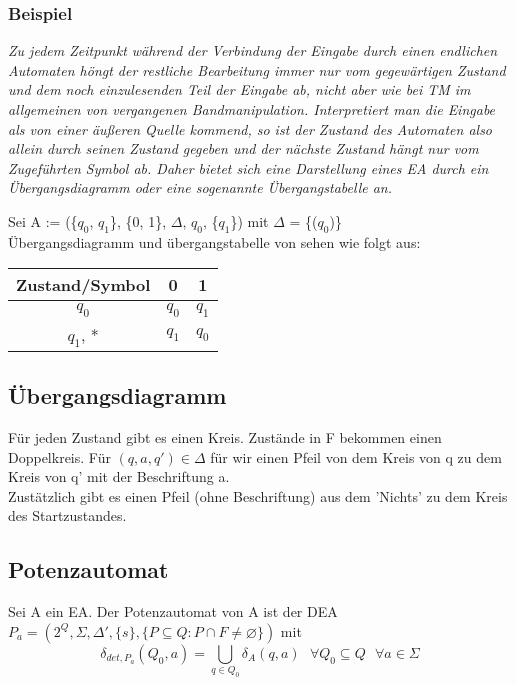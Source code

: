     \subsubsection*{Beispiel}
    \textit{Zu jedem Zeitpunkt während der Verbindung der Eingabe durch einen endlichen Automaten höngt der restliche Bearbeitung immer nur vom gegewärtigen Zustand und dem noch einzulesenden Teil der Eingabe ab, nicht aber wie bei TM im allgemeinen von vergangenen Bandmanipulation. Interpretiert man die Eingabe als von einer äußeren Quelle kommend, so ist der  Zustand des Automaten also allein durch seinen Zustand gegeben und der nächste Zustand hängt nur vom Zugeführten Symbol ab. Daher bietet sich eine Darstellung eines EA durch ein Übergangsdiagramm oder eine sogenannte Übergangstabelle an.}\par\bigskip
    Sei A := (\{$q_{0}$, $q_{1}$\}, \{0, 1\}, $\Delta$, $q_{0}$, \{$q_{1}$\}) mit $\Delta$ = \{($q_{0}$)\}\\
Übergangsdiagramm und übergangstabelle von sehen wie folgt aus:
\begin{center}
    \begin{tabular}{|c|c|c|}
        \hline
        Zustand/Symbol & 0 & 1 \\
        \hline
        $q_{0}$ & $q_{0}$ & $q_{1}$ \\
        \hline
        $q_{1}$, * & $q_{1}$ & $q_{0}$ \\
        \hline
    \end{tabular}            
\end{center}
\subsection{Übergangsdiagramm}
    Für jeden Zustand gibt es einen Kreis. Zustände in F bekommen einen Doppelkreis. Für \((q,a,q')\in\Delta\) für wir 
    einen Pfeil von dem Kreis von q zu dem Kreis von q' mit der Beschriftung a.\\
    Zustätzlich gibt es einen Pfeil (ohne Beschriftung) aus dem 'Nichts' zu dem Kreis des Startzustandes.
\subsection{Potenzautomat}
    Sei A ein EA. Der Potenzautomat von A ist der DEA \(P_a=(2^Q, \Sigma, \Delta',\{s\},\{P\subseteq Q:P\cap F\neq\varnothing\})\) mit
    \[\delta_{det,P_a}(Q_0,a)=\bigcup\limits_{q\in Q_0}\delta_A(q,a)\text{ }\forall Q_0\subseteq Q\text{ }\forall a\in\Sigma\]
